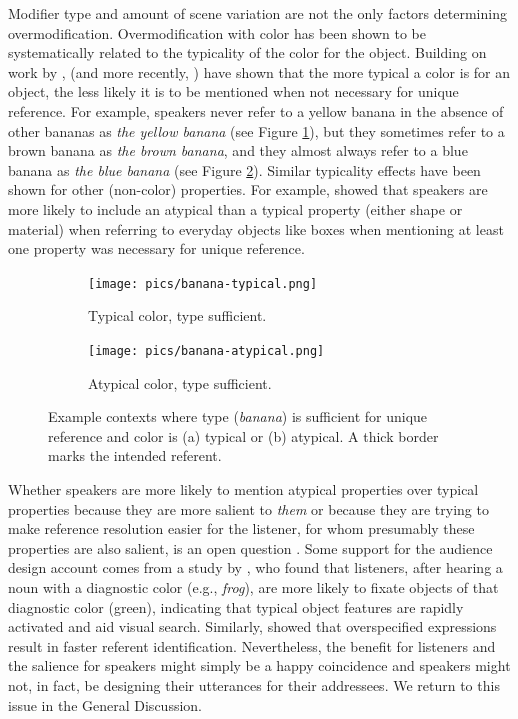 \documentclass[11pt]{article}
\newcommand{\figref}[1]{Figure \ref{#1}}
\begin{document}
Modifier type and amount of scene variation are not the only factors determining overmodification. Overmodification with color has been shown to be systematically related to the typicality of the color for the object. Building on work by ,  (and more recently, ) have shown that the more typical a color is for an object, the less likely it is to be mentioned when not necessary for unique reference. For example, speakers never refer to a yellow banana in the absence of other bananas as \emph{the yellow banana} (see \figref{fig:typical}), but they sometimes refer to a brown banana as \emph{the brown banana}, and they almost always refer to a blue banana as \emph{the blue banana} (see \figref{fig:atypical}). Similar typicality effects have been shown for other (non-color) properties. For example,  showed that speakers are more likely to include an atypical than a typical property (either shape or material) when referring to everyday objects like boxes when mentioning at least one property was necessary for unique reference. 

\begin{figure}
\begin{subfigure}{.5\textwidth}
\texttt{[image: pics/banana-typical.png]}
\caption{Typical color, type sufficient.}
\label{fig:typical}
\end{subfigure}
\begin{subfigure}{.5\textwidth}
\texttt{[image: pics/banana-atypical.png]}
\caption{Atypical color, type sufficient.}
\label{fig:atypical}
\end{subfigure}
\caption{Example contexts where type (\emph{banana}) is sufficient for unique reference and color is (a) typical or (b) atypical. A thick border marks the intended referent.}
\label{fig:banana}
\end{figure}

Whether speakers are more likely to mention atypical properties over typical properties because they are more salient to \emph{them} or because they are trying to make reference resolution easier for the listener, for whom presumably these properties are also salient, is an open question \cite{Westerbeek2015}. Some support for the audience design account comes from a study by , who found that listeners, after hearing a noun with a diagnostic color (e.g., \emph{frog}), are more likely to fixate objects of that diagnostic color (green), indicating that typical object features are rapidly activated and aid visual search. Similarly,  showed that overspecified expressions result in faster referent identification.  Nevertheless, the benefit for listeners and the salience for speakers might simply be a happy coincidence and speakers might not, in fact, be designing their utterances for their addressees. We return to this issue in the General Discussion. 
\end{document}
